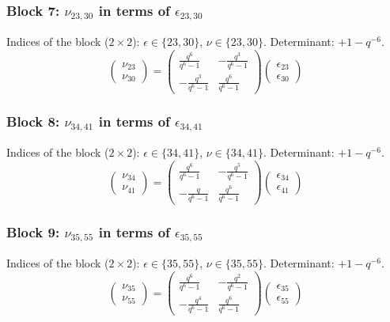 \subsubsection{Block 7: $\nu_{23, 30}$ in terms of $\epsilon_{23, 30}$}
Indices of the block ($2\times 2$): $\epsilon \in \{23, 30\}$, $\nu \in \{23, 30\}$.
Determinant: $+1-q^{-6}$.
\[
\begin{pmatrix}
\nu_{23} \\
\nu_{30}
\end{pmatrix}
=
\begin{pmatrix}
\frac{q^{6}}{q^{6}-1} & -\frac{q^{3}}{q^{6}-1} \\
-\frac{q^{3}}{q^{6}-1} & \frac{q^{6}}{q^{6}-1}
\end{pmatrix}
\begin{pmatrix}
\epsilon_{23} \\
\epsilon_{30}
\end{pmatrix}
\]

\subsubsection{Block 8: $\nu_{34, 41}$ in terms of $\epsilon_{34, 41}$}
Indices of the block ($2\times 2$): $\epsilon \in \{34, 41\}$, $\nu \in \{34, 41\}$.
Determinant: $+1-q^{-6}$.
\[
\begin{pmatrix}
\nu_{34} \\
\nu_{41}
\end{pmatrix}
=
\begin{pmatrix}
\frac{q^{6}}{q^{6}-1} & -\frac{q^{5}}{q^{6}-1} \\
-\frac{q}{q^{6}-1} & \frac{q^{6}}{q^{6}-1}
\end{pmatrix}
\begin{pmatrix}
\epsilon_{34} \\
\epsilon_{41}
\end{pmatrix}
\]

\subsubsection{Block 9: $\nu_{35, 55}$ in terms of $\epsilon_{35, 55}$}
Indices of the block ($2\times 2$): $\epsilon \in \{35, 55\}$, $\nu \in \{35, 55\}$.
Determinant: $+1-q^{-6}$.
\[
\begin{pmatrix}
\nu_{35} \\
\nu_{55}
\end{pmatrix}
=
\begin{pmatrix}
\frac{q^{6}}{q^{6}-1} & -\frac{q^{2}}{q^{6}-1} \\
-\frac{q^{4}}{q^{6}-1} & \frac{q^{6}}{q^{6}-1}
\end{pmatrix}
\begin{pmatrix}
\epsilon_{35} \\
\epsilon_{55}
\end{pmatrix}
\]

